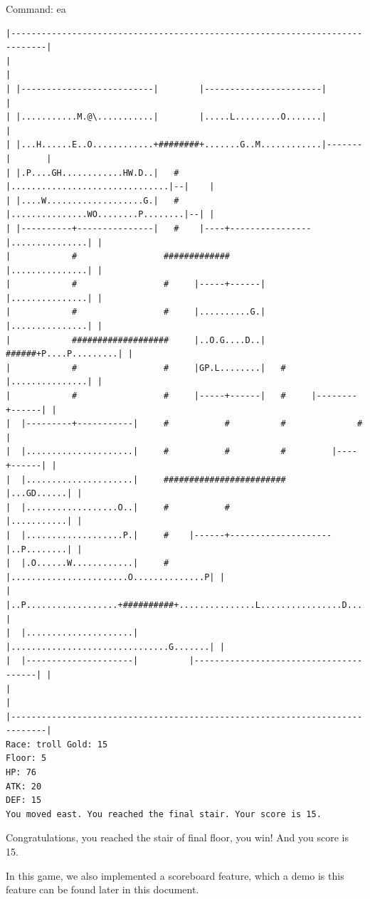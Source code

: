 \documentclass[11pt]{article}
\theoremstyle{plain}
\begin{document}
Command: ea
\begin{Verbatim}[fontsize=\scriptsize]
|-----------------------------------------------------------------------------|
|                                                                             |
| |--------------------------|        |-----------------------|               |
| |...........M.@\...........|        |.....L.........O.......|               |
| |...H......E..O............+########+.......G..M............|-------|       |
| |.P....GH............HW.D..|   #    |...............................|--|    |
| |....W...................G.|   #    |...............WO........P........|--| |
| |----------+---------------|   #    |----+----------------|...............| |
|            #                 #############                |...............| |
|            #                 #     |-----+------|         |...............| |
|            #                 #     |..........G.|         |...............| |
|            ###################     |..O.G....D..|   ######+P....P.........| |
|            #                 #     |GP.L........|   #     |...............| |
|            #                 #     |-----+------|   #     |--------+------| |
|  |---------+-----------|     #           #          #              #        |
|  |.....................|     #           #          #         |----+------| |
|  |.....................|     ########################         |...GD......| |
|  |..................O..|     #           #                    |...........| |
|  |...................P.|     #    |------+--------------------|..P........| |
|  |.O......W............|     #    |.......................O..............P| |
|  |..P..................+##########+...............L................D......| |
|  |.....................|          |...............................G.......| |
|  |---------------------|          |---------------------------------------| |
|                                                                             |
|-----------------------------------------------------------------------------|
Race: troll Gold: 15                                                   Floor: 5
HP: 76
ATK: 20
DEF: 15
You moved east. You reached the final stair. Your score is 15. 
\end{Verbatim}

Congratulations, you reached the stair of final floor, you win! 
And you score is 15.


In this game, we also implemented a scoreboard feature, which a demo is this 
feature can be found later in this document.
\end{document}
